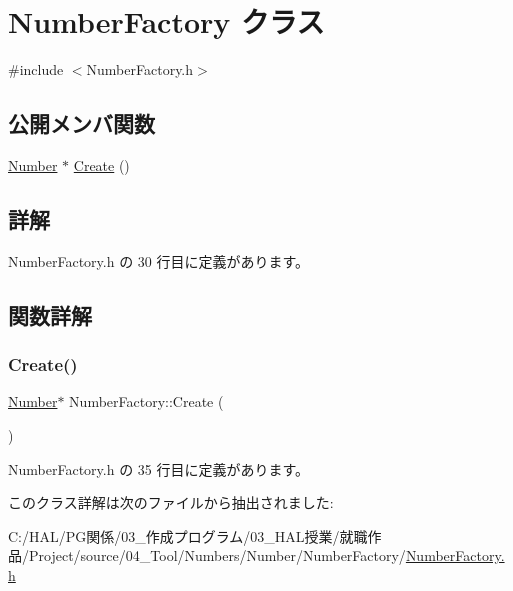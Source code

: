 \hypertarget{class_number_factory}{}\section{Number\+Factory クラス}
\label{class_number_factory}


{\ttfamily \#include $<$Number\+Factory.\+h$>$}

\subsection*{公開メンバ関数}
\begin{DoxyCompactItemize}
\item 
\mbox{\hyperlink{class_number}{Number}} $\ast$ \mbox{\hyperlink{class_number_factory_aace5458332c982b3f12265abaf5a3308}{Create}} ()
\end{DoxyCompactItemize}


\subsection{詳解}


 Number\+Factory.\+h の 30 行目に定義があります。



\subsection{関数詳解}
\mbox{\label{class_number_factory_aace5458332c982b3f12265abaf5a3308}} 
\subsubsection{\texorpdfstring{Create()}{Create()}}
{\footnotesize\ttfamily \mbox{\hyperlink{class_number}{Number}}$\ast$ Number\+Factory\+::\+Create (\begin{DoxyParamCaption}{ }\end{DoxyParamCaption})\hspace{0.3cm}{\ttfamily [inline]}}



 Number\+Factory.\+h の 35 行目に定義があります。



このクラス詳解は次のファイルから抽出されました\+:\begin{DoxyCompactItemize}
\item 
C\+:/\+H\+A\+L/\+P\+G関係/03\+\_\+作成プログラム/03\+\_\+\+H\+A\+L授業/就職作品/\+Project/source/04\+\_\+\+Tool/\+Numbers/\+Number/\+Number\+Factory/\mbox{\hyperlink{_number_factory_8h}{Number\+Factory.\+h}}\end{DoxyCompactItemize}
